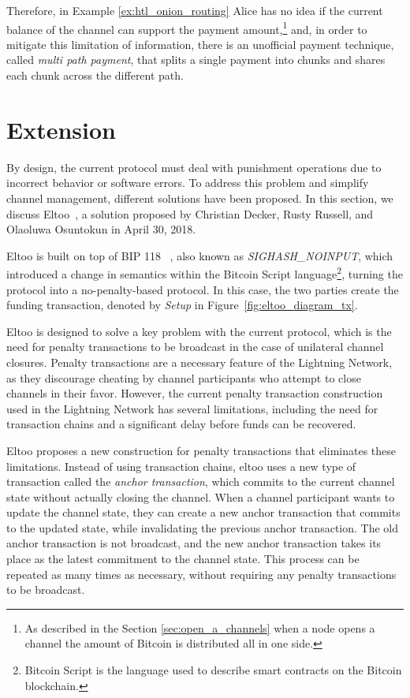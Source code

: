 Therefore, in Example \ref{ex:htl_onion_routing} Alice has no idea if the current balance of the channel can support the payment amount,\footnote{As described in the Section \ref{sec:open_a_channels} when a node opens a channel the amount of Bitcoin is distributed all in one side.} and, in order to mitigate this limitation of information, there is an unofficial payment technique, called \emph{multi path payment}, that splits a single payment into chunks and shares each chunk across the different path.

\section{{\LN} Extension}
\label{sec:eltoo}

By design, the current {\LN} protocol must deal with punishment operations due to incorrect
behavior or software errors. To address this problem and simplify channel management,
different solutions have been proposed. In this section, we discuss Eltoo~\cite{eltoo}, a
solution proposed by Christian Decker, Rusty Russell, and Olaoluwa Osuntokun in April 30, 2018.

Eltoo is built on top of BIP 118 ~\cite{bip118}, also known as \emph{SIGHASH\_NOINPUT},
which introduced a change in semantics within the Bitcoin Script language\footnote{Bitcoin Script is the language used to describe smart contracts on the Bitcoin blockchain.}, turning the {\LN} protocol into a no-penalty-based protocol.
In this case, the two parties create the funding transaction,
denoted by \emph{Setup} in Figure~\ref{fig:eltoo_diagram_tx}.

Eltoo is designed to solve a key problem with the current {\LN}
protocol, which is the need for penalty transactions to be broadcast in the case
of unilateral channel closures. Penalty transactions are a necessary feature of
the Lightning Network, as they discourage cheating by channel participants who
attempt to close channels in their favor. However, the current penalty transaction
construction used in the Lightning Network has several limitations, including the
need for transaction chains and a significant delay before funds can be recovered.

Eltoo proposes a new construction for penalty transactions that eliminates these
limitations. Instead of using transaction chains, eltoo uses a new type of
transaction called the \textit{anchor transaction}, which commits to the
current channel state without actually closing the channel. When a channel
participant wants to update the channel state, they can create a new anchor
transaction that commits to the updated state, while invalidating the previous anchor
transaction. The old anchor transaction is not broadcast, and the new anchor transaction
takes its place as the latest commitment to the channel state. This process can be repeated
as many times as necessary, without requiring any penalty transactions to be broadcast.

